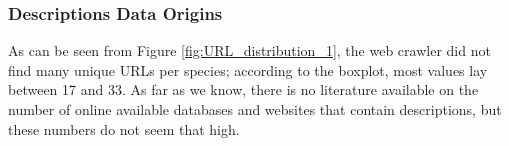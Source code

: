\documentclass[a4paper, 12pt, oneside]{book} %
\begin{document}
\subsubsection{Descriptions Data Origins}
As can be seen from Figure \ref{fig:URL_distribution_1}, the web crawler did not find many unique URLs per species; according to the boxplot, most values lay between 17 and 33.
As far as we know, there is no literature available on the number of online available databases and websites that contain descriptions, but these numbers do not seem that high.
\end{document}
